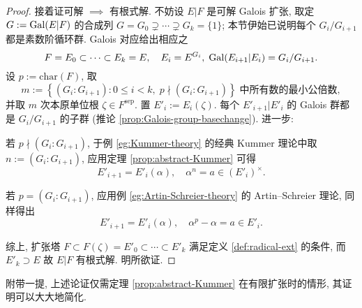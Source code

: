 \begin{proof}
	
	接着证可解 $\implies$ 有根式解. 不妨设 $E|F$ 是可解 Galois 扩张, 取定 $G := \operatorname{Gal}(E|F)$ 的合成列 $G = G_0 \supsetneq \cdots \supsetneq G_k = \{1\}$; 本节伊始已说明每个 $G_i/G_{i+1}$ 都是素数阶循环群. Galois 对应给出相应之
	\[ F = E_0 \subset \cdots \subset E_k = E, \quad E_i = E^{G_i},\; \operatorname{Gal}(E_{i+1}|E_i) = G_i/G_{i+1}. \]
	设 $p := \text{char}(F)$, 取
	\[ m := \left\{ (G_i:G_{i+1}) : 0 \leq i < k, \; p \nmid (G_i : G_{i+1}) \right\} \; \text{中所有数的最小公倍数}, \]
	并取 $m$ 次本原单位根 $\zeta \in F^{\text{sep}}$. 置 $E'_i := E_i(\zeta)$. 每个 $E'_{i+1} | E'_i$ 的 Galois 群都是 $G_i/G_{i+1}$ 的子群 (推论 \ref{prop:Galois-group-basechange}). 进一步:
	\begin{compactitem}
		\item 若 $p \nmid (G_i : G_{i+1})$, 于例 \ref{eg:Kummer-theory} 的经典 Kummer 理论中取 $n := (G_i : G_{i+1})$, 应用定理 \ref{prop:abstract-Kummer} 可得
			\[ E'_{i+1} = E'_i(\alpha), \quad \alpha^n = a \in (E'_i)^\times. \]
		\item 若 $p = (G_i : G_{i+1})$, 应用例 \ref{eg:Artin-Schreier-theory} 的 Artin--Schreier 理论, 同样得出
			\[ E'_{i+1} = E'_i(\alpha), \quad \alpha^p - \alpha = a \in E'_i. \]
	\end{compactitem}
	综上, 扩张塔 $F \subset F(\zeta)=E'_0 \subset \cdots \subset E'_k$ 满足定义 \ref{def:radical-ext} 的条件, 而 $E'_k \supset E$ 故 $E|F$ 有根式解. 明所欲证.
\end{proof}
附带一提, 上述论证仅需定理 \ref{prop:abstract-Kummer} 在有限扩张时的情形, 其证明可以大大地简化.

